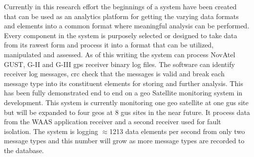 Currently in this research effort the beginnings of a system have been created that can be used as an analytics platform for getting the varying data formats and elements into a common format where meaningful analysis can be performed.  Every component in the system is purposely selected or designed to take data from its rawest form and process it into a format that can be utilized, manipulated and assessed. As of this writing the system can process NovAtel GUST, G-II and G-III \ac{gps} receiver binary log files. The software can identify receiver log messages, \ac{crc} check that the messages is valid and break each message type into its constituent elements for storing and further analysis. This has been fully demonstrated end to end on a \ac{geo} Satellite monitoring system in development. This system is currently monitoring one \ac{geo} satellite at one \ac{gus} site but will be expanded to four \ac{geo}s at 8 \ac{gus} sites in the near future. It process data from the WAAS application receiver and a second receiver used for fault isolation. The system is logging $\approx$1213 data elements per second from only two message types and this number will grow as more message types are recorded to the database.
